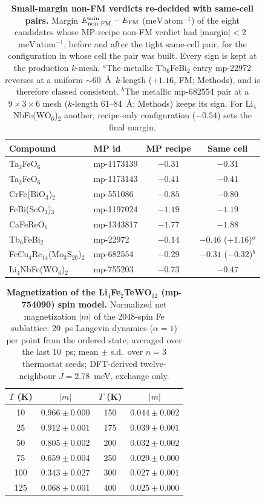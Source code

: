 \documentclass[aps,prb,preprint,superscriptaddress,longbibliography,nofootinbib]{revtex4-2}
\newcommand{\meVat}{\ensuremath{\mathrm{meV\,atom^{-1}}}}
\begin{document}
\begin{table}[h]
\centering
\caption{\textbf{Small-margin non-FM verdicts re-decided with same-cell pairs.} Margin
$E^{\min}_{\rm non\text{-}FM}-E_{\rm FM}$ (\meVat) of the eight candidates whose MP-recipe non-FM verdict had
$|$margin$|<2$~\meVat, before and after the tight same-cell pair, for the configuration in whose cell the pair
was built. Every sign is kept at the production $k$-mesh. $^a$The metallic Tb$_6$FeBi$_2$ entry mp-22972
reverses at a uniform $\sim$60~\AA\ $k$-length ($+1.16$, FM; Methods), and is therefore classed consistent. $^b$The metallic mp-682554 pair at a $9\times3\times6$ mesh ($k$-length
61--84~\AA; Methods) keeps its sign. For Li$_4$NbFe(WO$_6$)$_2$ another, recipe-only configuration ($-0.54$) sets the
final margin.}
\label{tabS:tight}
\begin{tabular}{llcc}
\toprule
Compound & MP id & MP recipe & Same cell \\
\midrule
Ta$_2$FeO$_6$ & mp-1173139 & $-0.31$ & $-0.31$ \\
Ta$_2$FeO$_6$ & mp-1173143 & $-0.41$ & $-0.41$ \\
CrFe(BiO$_3$)$_2$ & mp-551086 & $-0.85$ & $-0.80$ \\
FeBi(SeO$_3$)$_3$ & mp-1197024 & $-1.19$ & $-1.19$ \\
CaFeReO$_6$ & mp-1343817 & $-1.77$ & $-1.88$ \\
Tb$_6$FeBi$_2$ & mp-22972 & $-0.14$ & $-0.46$ ($+1.16$)$^a$ \\
FeCu$_4$Re$_{14}$(Mo$_3$S$_{20}$)$_2$ & mp-682554 & $-0.29$ & $-0.31$ ($-0.32$)$^b$ \\
Li$_4$NbFe(WO$_6$)$_2$ & mp-755203 & $-0.73$ & $-0.47$ \\
\bottomrule
\end{tabular}
\end{table}

\begin{table}[h]
\centering
\caption{\textbf{Magnetization of the Li$_4$Fe$_2$TeWO$_{12}$ (mp-754090) spin model.} Normalized net
magnetization $|m|$ of the 2048-spin Fe sublattice: 20~ps Langevin dynamics ($\alpha=1$) per point from the
ordered state, averaged over the last 10~ps; mean $\pm$ s.d.\ over $n=3$ thermostat seeds; DFT-derived
twelve-neighbour $J=2.78$~meV, exchange only.}
\label{tabS:mvt754090}
\begin{tabular}{cccc}
\toprule
$T$ (K) & $|m|$ & $T$ (K) & $|m|$ \\
\midrule
10  & $0.966\pm0.000$ & 150 & $0.044\pm0.002$ \\
25  & $0.912\pm0.001$ & 175 & $0.039\pm0.001$ \\
50  & $0.805\pm0.002$ & 200 & $0.032\pm0.002$ \\
75  & $0.659\pm0.004$ & 250 & $0.029\pm0.000$ \\
100 & $0.343\pm0.027$ & 300 & $0.027\pm0.001$ \\
125 & $0.068\pm0.001$ & 400 & $0.025\pm0.000$ \\
\bottomrule
\end{tabular}
\end{table}
\end{document}
